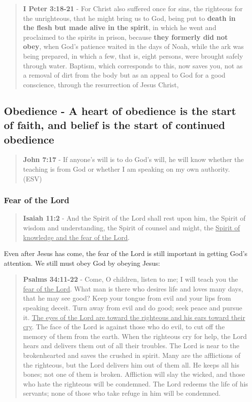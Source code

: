 \documentclass[11pt]{article}
\begin{document}
\begin{quote}
\textbf{I Peter 3:18-21} - For Christ also suffered once for sins, the righteous for the unrighteous, that he might bring us to God, being put to \textbf{death in the flesh but made alive in the spirit}, in which he went and proclaimed to the spirits in prison, because \textbf{they formerly did not obey}, when God's patience waited in the days of Noah, while the ark was being prepared, in which a few, that is, eight persons, were brought safely through water. Baptism, which corresponds to this, now saves you, not as a removal of dirt from the body but as an appeal to God for a good conscience, through the resurrection of Jesus Christ,
\end{quote}

\subsection{Obedience - A heart of obedience is the start of faith, and belief is the start of continued obedience}
\label{sec:orgdac5d28}
\begin{quote}
\textbf{John 7:17} -  If anyone's will is to do God's will, he will know whether the teaching is from God or whether I am speaking on my own authority. (ESV)
\end{quote}

\subsubsection{Fear of the Lord}
\label{sec:orge047c2b}
\begin{quote}
\textbf{Isaiah 11:2} - And the Spirit of the Lord shall rest upon him, the Spirit of wisdom and understanding, the Spirit of counsel and might, the \uline{Spirit of knowledge and the fear of the Lord}.
\end{quote}

Even after Jesus has come, the fear of the Lord is still important in getting God's attention. We still must obey God by obeying Jesus:

\begin{quote}
\textbf{Psalms 34:11-22} - Come, O children, listen to me; I will teach you the \uline{fear of the Lord}. What man is there who desires life and loves many days, that he may see good? Keep your tongue from evil and your lips from speaking deceit. Turn away from evil and do good; seek peace and pursue it. \uline{The eyes of the Lord are toward the righteous and his ears toward their cry}. The face of the Lord is against those who do evil, to cut off the memory of them from the earth. When the righteous cry for help, the Lord hears and delivers them out of all their troubles. The Lord is near to the brokenhearted and saves the crushed in spirit. Many are the afflictions of the righteous, but the Lord delivers him out of them all. He keeps all his bones; not one of them is broken. Affliction will slay the wicked, and those who hate the righteous will be condemned. The Lord redeems the life of his servants; none of those who take refuge in him will be condemned.
\end{quote}
\end{document}
